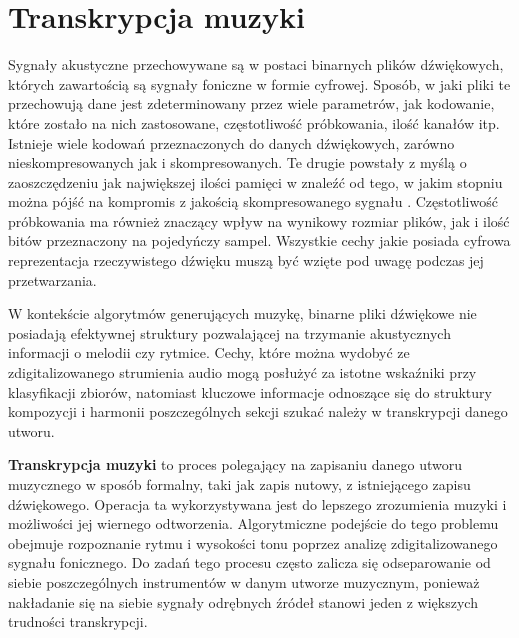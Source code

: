 \documentclass[12pt,a4paper,twoside]{mwart}
\begin{document}
\section{Transkrypcja muzyki}
Sygnały akustyczne przechowywane są w postaci binarnych plików dźwiękowych, których zawartością są sygnały foniczne w formie cyfrowej. Sposób, w jaki pliki te przechowują dane jest zdeterminowany przez wiele parametrów, jak kodowanie, które zostało na nich zastosowane, częstotliwość próbkowania, ilość kanałów itp. Istnieje wiele kodowań przeznaczonych do danych dźwiękowych, zarówno nieskompresowanych jak i skompresowanych. Te drugie powstały z myślą o zaoszczędzeniu jak największej ilości pamięci w znaleźć od tego, w jakim stopniu można pójść na kompromis z jakością skompresowanego sygnału \cite[66]{Homerecording:DlaKazdego}. Częstotliwość próbkowania ma również znaczący wpływ na wynikowy rozmiar plików, jak i ilość bitów przeznaczony na pojedyńczy sampel. Wszystkie cechy jakie posiada cyfrowa reprezentacja rzeczywistego dźwięku muszą być wzięte pod uwagę podczas jej przetwarzania.

W kontekście algorytmów generujących muzykę, binarne pliki dźwiękowe nie posiadają efektywnej struktury pozwalającej na trzymanie akustycznych informacji o melodii czy rytmice. Cechy, które można wydobyć ze zdigitalizowanego strumienia audio mogą posłużyć za istotne wskaźniki przy klasyfikacji zbiorów, natomiast kluczowe informacje odnoszące się do struktury kompozycji i harmonii poszczególnych sekcji szukać należy w transkrypcji danego utworu. 


\textbf{Transkrypcja muzyki} to proces polegający na zapisaniu danego utworu muzycznego w sposób formalny, taki jak zapis nutowy, z istniejącego zapisu dźwiękowego. Operacja ta wykorzystywana jest do lepszego zrozumienia muzyki i możliwości jej wiernego odtworzenia. Algorytmiczne podejście do tego problemu obejmuje rozpoznanie rytmu i wysokości tonu poprzez analizę zdigitalizowanego sygnału fonicznego. Do zadań tego procesu często zalicza się odseparowanie od siebie poszczególnych instrumentów w danym utworze muzycznym, ponieważ nakładanie się na siebie sygnały odrębnych źródeł stanowi jeden z większych trudności transkrypcji.
\end{document}
